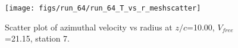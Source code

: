\begin{figure}[H]
\centering
\texttt{[image: figs/run\_64/run\_64\_T\_vs\_r\_meshscatter]}
\caption{Scatter plot of azimuthal velocity vs radius at $z/c$=10.00, $V_{free}$=21.15, station 7.}
\label{fig:run_64_T_vs_r_meshscatter}
\end{figure}


